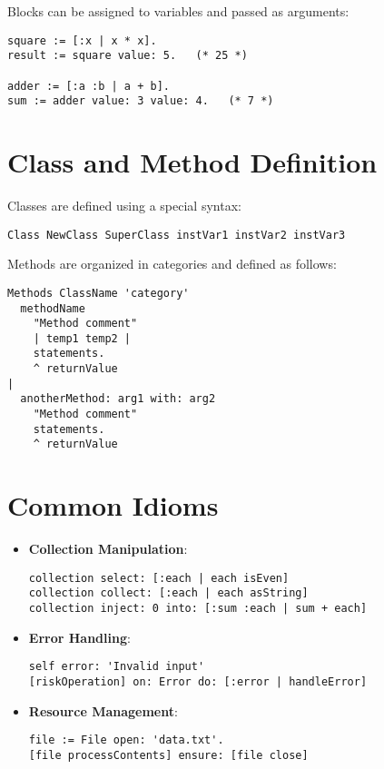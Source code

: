 \documentclass[12pt,a4paper]{report}
\begin{document}
Blocks can be assigned to variables and passed as arguments:

\begin{lstlisting}[style=smalltalk]
square := [:x | x * x].
result := square value: 5.   (* 25 *)

adder := [:a :b | a + b].
sum := adder value: 3 value: 4.   (* 7 *)
\end{lstlisting}

\section{Class and Method Definition}

Classes are defined using a special syntax:

\begin{lstlisting}[style=smalltalk]
Class NewClass SuperClass instVar1 instVar2 instVar3
\end{lstlisting}

Methods are organized in categories and defined as follows:

\begin{lstlisting}[style=smalltalk]
Methods ClassName 'category'
  methodName
    "Method comment"
    | temp1 temp2 |
    statements.
    ^ returnValue
|
  anotherMethod: arg1 with: arg2
    "Method comment"
    statements.
    ^ returnValue
\end{lstlisting}

\section{Common Idioms}

\begin{itemize}
    \item \textbf{Collection Manipulation}:
    \begin{lstlisting}[style=smalltalk]
collection select: [:each | each isEven]
collection collect: [:each | each asString]
collection inject: 0 into: [:sum :each | sum + each]
\end{lstlisting}

    \item \textbf{Error Handling}:
    \begin{lstlisting}[style=smalltalk]
self error: 'Invalid input'
[riskOperation] on: Error do: [:error | handleError]
\end{lstlisting}

    \item \textbf{Resource Management}:
    \begin{lstlisting}[style=smalltalk]
file := File open: 'data.txt'.
[file processContents] ensure: [file close]
\end{lstlisting}
\end{itemize}
\end{document}
